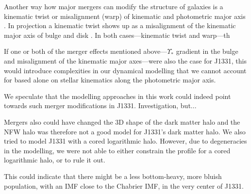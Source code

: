 Another way how major mergers can modify the structure of galaxies is a kinematic twist \Wilma{[TO DO: REF]} or misalignment (warp) of kinematic and photometric major axis \Wilma{[TO DO: REF]}. In projection a kinematic twist shows up as a misalignment of the kinematic major axis of bulge and disk . In both cases---kinematic twist and warp---th \Wilma{[TO DO: Continue]}


If one or both of the merger effects mentioned above---$\Upsilon_*$ gradient in the bulge and misalignment of the kinematic major axes---were also the case for J1331, this would introduce complexities in our dynamical modelling that we cannot account for based alone on stellar kinematics along the photometric major axis.

We speculate that the modelling approaches in this work could indeed point towards such merger modifications in J1331. Investigation, but... 



Mergers also could have changed the 3D shape of the dark matter halo and the NFW halo was therefore not a good model for J1331's dark matter halo. We also tried to model J1331 with a cored logarithmic halo. However, due to degeneracies in the modelling, we were not able to either constrain the profile for a cored logarithmic halo, or to rule it out. 


This could indicate that there might be a less bottom-heavy, more bluish population, with an IMF close to the Chabrier IMF, in the very center of J1331.

